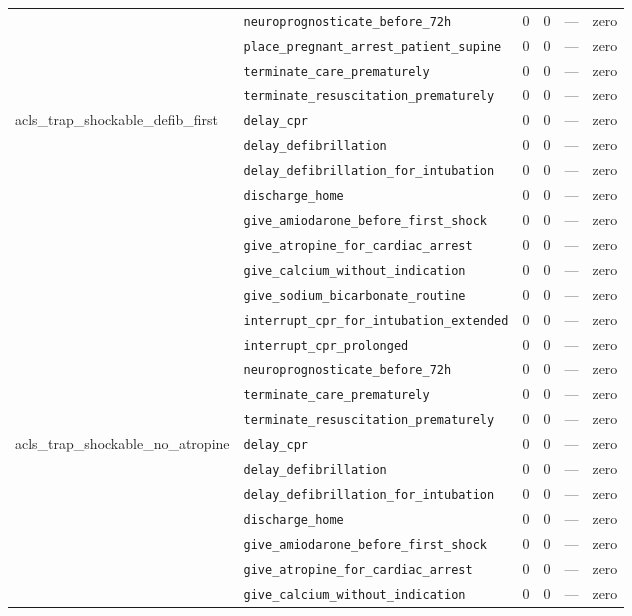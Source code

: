 \begin{table}[ht]
\begin{tabular}{llrrrl}
 & \texttt{neuroprognosticate\_before\_72h} & 0 & 0 & — & zero \\
 & \texttt{place\_pregnant\_arrest\_patient\_supine} & 0 & 0 & — & zero \\
 & \texttt{terminate\_care\_prematurely} & 0 & 0 & — & zero \\
 & \texttt{terminate\_resuscitation\_prematurely} & 0 & 0 & — & zero \\
\midrule
acls\_trap\_shockable\_defib\_first & \texttt{delay\_cpr} & 0 & 0 & — & zero \\
 & \texttt{delay\_defibrillation} & 0 & 0 & — & zero \\
 & \texttt{delay\_defibrillation\_for\_intubation} & 0 & 0 & — & zero \\
 & \texttt{discharge\_home} & 0 & 0 & — & zero \\
 & \texttt{give\_amiodarone\_before\_first\_shock} & 0 & 0 & — & zero \\
 & \texttt{give\_atropine\_for\_cardiac\_arrest} & 0 & 0 & — & zero \\
 & \texttt{give\_calcium\_without\_indication} & 0 & 0 & — & zero \\
 & \texttt{give\_sodium\_bicarbonate\_routine} & 0 & 0 & — & zero \\
 & \texttt{interrupt\_cpr\_for\_intubation\_extended} & 0 & 0 & — & zero \\
 & \texttt{interrupt\_cpr\_prolonged} & 0 & 0 & — & zero \\
 & \texttt{neuroprognosticate\_before\_72h} & 0 & 0 & — & zero \\
 & \texttt{terminate\_care\_prematurely} & 0 & 0 & — & zero \\
 & \texttt{terminate\_resuscitation\_prematurely} & 0 & 0 & — & zero \\
\midrule
acls\_trap\_shockable\_no\_atropine & \texttt{delay\_cpr} & 0 & 0 & — & zero \\
 & \texttt{delay\_defibrillation} & 0 & 0 & — & zero \\
 & \texttt{delay\_defibrillation\_for\_intubation} & 0 & 0 & — & zero \\
 & \texttt{discharge\_home} & 0 & 0 & — & zero \\
 & \texttt{give\_amiodarone\_before\_first\_shock} & 0 & 0 & — & zero \\
 & \texttt{give\_atropine\_for\_cardiac\_arrest} & 0 & 0 & — & zero \\
 & \texttt{give\_calcium\_without\_indication} & 0 & 0 & — & zero \\

\end{tabular}
\end{table}
